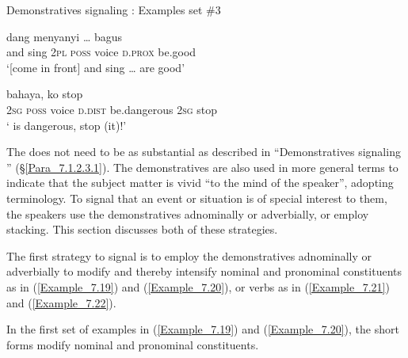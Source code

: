 {\begin{styleExampleTitle}
Demonstratives signaling : Examples set \#3
\end{styleExampleTitle}

\ea
\label{Example_7.17}
\gll {\ldots} {dang} {menyanyi} {\ldots} {} {} {} {} {bagus}\\ %
  { } and  sing  { } \textsc{2pl}  \textsc{poss}  voice  \textsc{d.prox}  be.good\\
\glt 
‘[come in front] and sing {\ldots}  are good’ \textstyleExampleSource{[081014-015-Cv.0026/0028]}\\
\z

\ea
\label{Example_7.18}
 {} {} {} {bahaya,} {ko} {stop}\\ %
 \textsc{2sg}  \textsc{poss}  voice  \textsc{d.dist}  be.dangerous  \textsc{2sg}  stop\\
\glt
‘ is dangerous, stop (it)!’ \textstyleExampleSource{[081025-009b-Cv.0016]}\\
\z



The  does not need to be as substantial as described in ``Demonstratives signaling '' (§\ref{Para_7.1.2.3.1}). The demonstratives are also used in more general terms to indicate that the subject matter is vivid “to the mind of the speaker”, adopting  terminology. To signal that an event or situation is of special interest to them, the speakers use the demonstratives adnominally or adverbially, or employ  stacking. This section discusses both of these strategies.



The first strategy to signal  is to employ the demonstratives adnominally or adverbially to modify and thereby intensify nominal and pronominal constituents as in (\ref{Example_7.19}) and (\ref{Example_7.20}), or verbs as in (\ref{Example_7.21}) and (\ref{Example_7.22}).



In the first set of examples in (\ref{Example_7.19}) and (\ref{Example_7.20}), the short  forms modify nominal and pronominal constituents.



}
